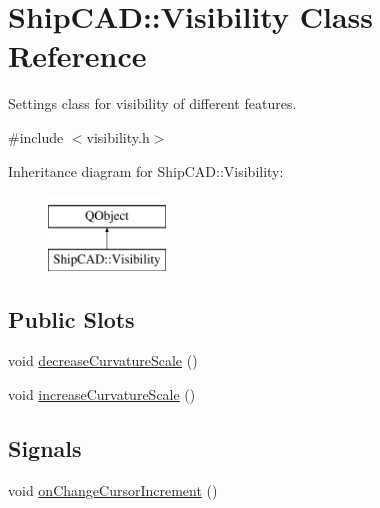 \hypertarget{classShipCAD_1_1Visibility}{\section{Ship\-C\-A\-D\-:\-:Visibility Class Reference}
\label{classShipCAD_1_1Visibility}
}


Settings class for visibility of different features.  




{\ttfamily \#include $<$visibility.\-h$>$}

Inheritance diagram for Ship\-C\-A\-D\-:\-:Visibility\-:\begin{figure}[H]
\begin{center}
\leavevmode
\includegraphics[height=2.000000cm]{classShipCAD_1_1Visibility}
\end{center}
\end{figure}
\subsection*{Public Slots}
\begin{DoxyCompactItemize}
\item 
void \hyperlink{classShipCAD_1_1Visibility_aa9ff89a0d825c2e5ac3fe9c08da9daec}{decrease\-Curvature\-Scale} ()
\item 
void \hyperlink{classShipCAD_1_1Visibility_af8ff6d1f77f64179f186a200ef7d056c}{increase\-Curvature\-Scale} ()
\end{DoxyCompactItemize}
\subsection*{Signals}
\begin{DoxyCompactItemize}
\item 
void \hyperlink{classShipCAD_1_1Visibility_a16de65dec1636dd1edc69b15d84c7735}{on\-Change\-Cursor\-Increment} ()
\end{DoxyCompactItemize}

